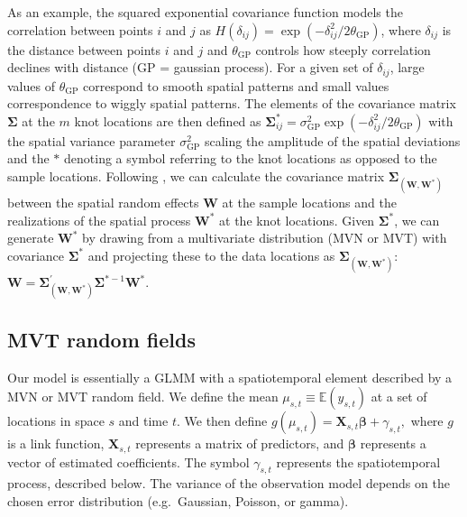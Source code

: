 \documentclass[12pt,english]{article}
\newcommand{\R}[1]{\label{#1}\linelabel{#1}}
\begin{document}
\begin{spacing}{1.8}
As an example, the squared exponential covariance function models the
correlation between points $i$ and $j$ as $H(\delta_{ij}) = \exp
\left(- \delta_{ij}^2 / 2 \theta_{\mathrm{GP}} \right)$, where $\delta_{ij}$ is the
distance between points $i$ and $j$ and $\theta_{\mathrm{GP}}$ controls how steeply correlation
declines with distance (GP = gaussian process). For a given set of $\delta_{ij}$, large values of $\theta_{\mathrm{GP}}$
correspond to smooth spatial patterns and small values correspondence to wiggly
spatial patterns.
The elements of the covariance matrix $\mathbf{\Sigma}$ at the $m$ knot locations are
then defined as $\mathbf{\Sigma}_{ij}^* = \sigma_{\mathrm{GP}}^2 \exp \left( -\delta_{ij}^2 / 2 \theta_{\mathrm{GP}}
\right)$ with the spatial variance parameter $\sigma_{\mathrm{GP}}^2$ scaling the amplitude of the spatial
deviations and the $*$ denoting a symbol referring to the knot locations as opposed to
the sample locations.
Following \citet{latimer2009}, we can calculate the covariance matrix
$\mathbf{\Sigma}_{\left(\mathbf{W}, \mathbf{W^*} \right)}$
between the spatial random effects $\mathbf{W}$ at the sample locations \R{B12}
and the realizations of the spatial process $\mathbf{W^*}$ at the knot locations.
Given
$\mathbf{\Sigma^*}$, we can generate $\mathbf{W^*}$ by drawing
from a multivariate distribution (MVN or MVT) with covariance $\mathbf{\Sigma^*}$ and
projecting these to the data locations as $\mathbf{\Sigma}_{\left( \mathbf{W},\mathbf{W^{*}} \right)}$:
$\mathbf{W}=\mathbf{\Sigma}_{\left(\mathbf{W},\mathbf{W^*} \right)}^{'} \mathbf{\Sigma}^{*-1}\mathbf{W^*}$.



\subsection{MVT random fields}

Our model is essentially a GLMM with a spatiotemporal element described by a MVN
or MVT random field. We define the mean $\mu_{s,t} \equiv \mathbb{E}(y_{s,t})$
at a set of locations
in space $s$ and time $t$.\R{B12} We then define $g(\mu_{s,t}) = \mathbf{X}_{s,t} \bm{\beta} +
\gamma_{s,t},$ where $g$ is a link function, $\mathbf{X}_{s,t}$ represents a matrix of
predictors, and $\bm{\beta}$ represents a vector of estimated coefficients. The symbol
$\gamma_{s,t}$ represents the spatiotemporal process, described below.
The variance of the observation model depends on the
chosen error distribution (e.g.\ Gaussian, Poisson, or gamma).\R{B14}


\end{spacing}
\end{document}

